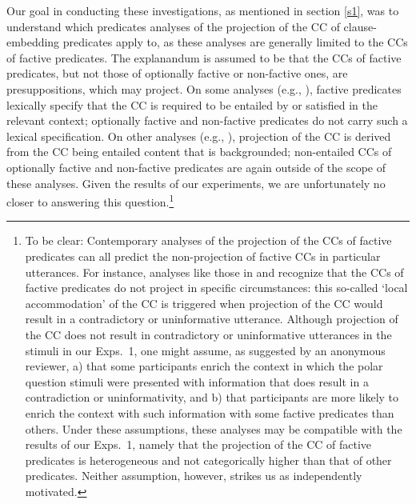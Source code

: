 \documentclass[11pt,fleqn]{article}
\newcommand{\6}{\mbox{$[\hspace*{-.6mm}[$}}
\newcommand{\9}{\mbox{$]\hspace*{-.6mm}]$}}
\begin{document}
Our goal in conducting these investigations, as mentioned in section \ref{s1}, was to understand which predicates analyses of the projection of the CC of clause-embedding predicates apply to, as these analyses are generally limited to the CCs of factive predicates. The explanandum is assumed to be that the CCs of factive predicates, but not those of optionally factive or non-factive ones, are presuppositions, which may project. On some analyses (e.g., \citealt{heim83,vds92}), factive predicates lexically specify that the CC is required to be entailed by or satisfied in the relevant context; optionally factive and non-factive predicates do not carry such a lexical specification. On other analyses (e.g., \citealt{abrusan2011,abrusan2016,romoli2015,best-question}), projection of the CC is derived from the CC being entailed content that is backgrounded; non-entailed CCs of optionally factive and non-factive predicates are again outside of the scope of these analyses. Given the results of our experiments, we are unfortunately no closer to answering this question.\footnote{To be clear: Contemporary analyses of the projection of the CCs of factive predicates can all predict the non-projection of factive CCs in particular utterances. For instance, analyses like those in \citealt{heim83} and \citealt{vds92} recognize that the CCs of factive predicates do not project in specific circumstances: this so-called `local accommodation' of the CC is triggered when projection of the CC would result in a contradictory or uninformative utterance. Although projection of the CC does not result in contradictory or uninformative utterances in the stimuli in our Exps.~1, one might assume, as suggested by an anonymous reviewer, a) that some participants enrich the context in which the polar question stimuli were presented with information that does result in a contradiction or uninformativity, and b) that participants are more likely to enrich the context with such information with some factive predicates than others. Under these assumptions, these analyses may be compatible with the results of our Exps.~1, namely that the projection of the CC of factive predicates is heterogeneous and not categorically higher than that of other predicates. Neither assumption, however, strikes us as independently motivated.} 
\end{document}
